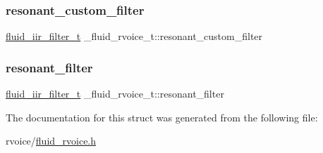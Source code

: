\subsubsection{\texorpdfstring{resonant\+\_\+custom\+\_\+filter}{resonant\_custom\_filter}}
{\footnotesize\ttfamily \hyperlink{fluid__iir__filter_8h_a195102aefee11bb26f43b39ecf86088a}{fluid\+\_\+iir\+\_\+filter\+\_\+t} \+\_\+fluid\+\_\+rvoice\+\_\+t\+::resonant\+\_\+custom\+\_\+filter}

\mbox{\label{struct__fluid__rvoice__t_a70d7bb364e3f986660e569e4656897d9}} 
\subsubsection{\texorpdfstring{resonant\+\_\+filter}{resonant\_filter}}
{\footnotesize\ttfamily \hyperlink{fluid__iir__filter_8h_a195102aefee11bb26f43b39ecf86088a}{fluid\+\_\+iir\+\_\+filter\+\_\+t} \+\_\+fluid\+\_\+rvoice\+\_\+t\+::resonant\+\_\+filter}



The documentation for this struct was generated from the following file\+:\begin{DoxyCompactItemize}
\item 
rvoice/\hyperlink{fluid__rvoice_8h}{fluid\+\_\+rvoice.\+h}\end{DoxyCompactItemize}
